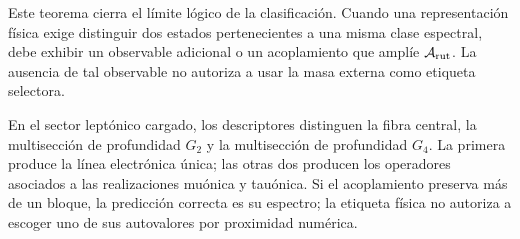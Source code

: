 Este teorema cierra el límite lógico de la clasificación. Cuando una
representación física exige distinguir dos estados pertenecientes a una misma
clase espectral, debe exhibir un observable adicional o un acoplamiento que
amplíe \(\mathcal A_{\rm rut}\). La ausencia de tal observable no autoriza a
usar la masa externa como etiqueta selectora.

En el sector leptónico cargado, los descriptores distinguen la fibra central,
la multisección de profundidad \(G_2\) y la multisección de profundidad
\(G_4\). La primera produce la línea electrónica única; las otras dos
producen los operadores asociados a las realizaciones muónica y tauónica. Si
el acoplamiento preserva más de un bloque, la predicción correcta es su
espectro; la etiqueta física no autoriza a escoger uno de sus autovalores por
proximidad numérica.


